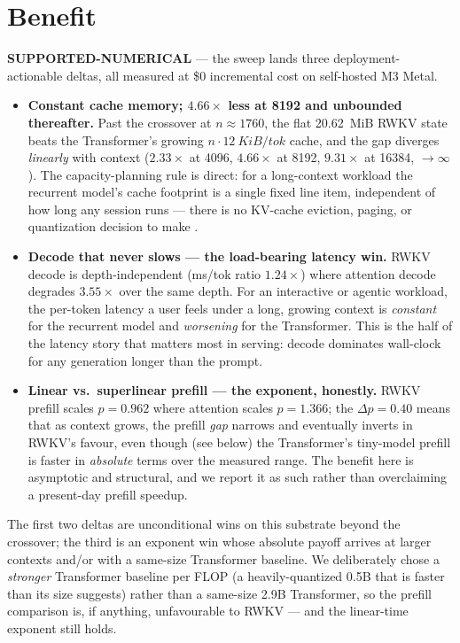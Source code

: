 \documentclass[11pt,a4paper]{article}
\newcommand{\green}[1]{\textcolor{green!50!black}{\textbf{#1}}}
\newcommand{\ctx}{\ensuremath{n}}
\begin{document}
\section{Benefit}
\label{sec:benefit}
\green{SUPPORTED-NUMERICAL} --- the sweep lands three deployment-actionable
deltas, all measured at \$0 incremental cost on self-hosted M3 Metal.

\begin{itemize}
  \item \textbf{Constant cache memory; \(4.66\times\) less at \num{8192} and
    unbounded thereafter.} Past the crossover at \(\ctx\approx\num{1760}\), the
    flat \SI{20.62}{MiB} RWKV state beats the Transformer's growing
    \(\ctx\cdot\SI{12}{KiB/tok}\) cache, and the gap diverges \emph{linearly}
    with context (\(2.33\times\) at \num{4096}, \(4.66\times\) at \num{8192},
    \(9.31\times\) at \num{16384}, \(\to\infty\)). The capacity-planning rule is
    direct: for a long-context workload the recurrent model's cache footprint is
    a single fixed line item, independent of how long any session runs ---
    there is no KV-cache eviction, paging, or quantization decision to make
    \citep{kwon2023vllm}.
  \item \textbf{Decode that never slows --- the load-bearing latency win.} RWKV
    decode is depth-independent (ms/tok ratio \(1.24\times\)) where attention
    decode degrades \(3.55\times\) over the same depth. For an interactive or
    agentic workload, the per-token latency a user feels under a long, growing
    context is \emph{constant} for the recurrent model and \emph{worsening} for
    the Transformer. This is the half of the latency story that matters most in
    serving: decode dominates wall-clock for any generation longer than the
    prompt.
  \item \textbf{Linear vs.\ superlinear prefill --- the exponent, honestly.}
    RWKV prefill scales \(p=0.962\) where attention scales \(p=1.366\); the
    \(\Delta p = 0.40\) means that as context grows, the prefill \emph{gap}
    narrows and eventually inverts in RWKV's favour, even though (see below) the
    Transformer's tiny-model prefill is faster in \emph{absolute} terms over the
    measured range. The benefit here is asymptotic and structural, and we report
    it as such rather than overclaiming a present-day prefill speedup.
\end{itemize}

\noindent The first two deltas are unconditional wins on this substrate beyond
the crossover; the third is an exponent win whose absolute payoff arrives at
larger contexts and/or with a same-size Transformer baseline. We deliberately
chose a \emph{stronger} Transformer baseline per FLOP (a heavily-quantized
0.5B that is faster than its size suggests) rather than a same-size 2.9B
Transformer, so the prefill comparison is, if anything, unfavourable to RWKV ---
and the linear-time exponent still holds.
\end{document}
